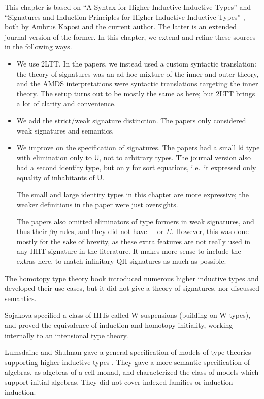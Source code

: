 \documentclass[12pt,a4paper,twoside,openany]{book}
\theoremstyle{remark}
\theoremstyle{definition}
\theoremstyle{theorem}
\newcommand{\U}{\mathsf{U}}
\newcommand{\Id}{\mathsf{Id}}
\begin{document}
This chapter is based on ``A Syntax for Higher Inductive-Inductive Types''
\cite{hiit} and ``Signatures and Induction Principles for Higher
Inductive-Inductive Types'' \cite{hiits}, both by Ambrus Kaposi and the current
author. The latter is an extended journal version of the former. In this
chapter, we extend and refine these sources in the following ways.
\begin{itemize}
\item
    We use 2LTT. In the papers, we instead used a custom syntactic translation:
    the theory of signatures was an ad hoc mixture of the inner and outer
    theory, and the AMDS interpretations were syntactic translations targeting
    the inner theory. The setup turns out to be mostly the same as here; but
    2LTT brings a lot of clarity and convenience.
\item
    We add the strict/weak signature distinction. The papers only considered
    weak signatures and semantics.
\item
    We improve on the specification of signatures. The papers had a small $\Id$
    type with elimination only to $\U$, not to arbitrary types. The journal
    version also had a second identity type, but only for sort equations,
    i.e.\ it expressed only equality of inhabitants of $\U$.

    The small and large identity types in this chapter are more expressive; the
    weaker definitions in the paper were just oversights.

    The papers also omitted eliminators of type formers in weak signatures, and
    thus their $\beta\eta$ rules, and they did not have $\top$ or
    $\Sigma$. However, this was done mostly for the sake of brevity, as these
    extra features are not really used in any HIIT signature in the literature.
    It makes more sense to include the extras here, to match infinitary QII
    signatures as much as possible.
\end{itemize}

The homotopy type theory book \cite{hottbook} introduced numerous higher
inductive types and developed their use cases, but it did not give a theory of
signatures, nor discussed semantics.

Sojakova \cite{sojakova} specified a class of HITs called W-suspensions
(building on W-types), and proved the equivalence of induction and homotopy
initiality, working internally to an intensional type theory.

Lumsdaine and Shulman gave a general specification of models of type theories
supporting higher inductive types \cite{lumsdaineShulman}. They gave a more
semantic specification of algebras, as algebras of a cell monad, and
characterized the class of models which support initial algebras. They did not
cover indexed families or induction-induction.
\end{document}
